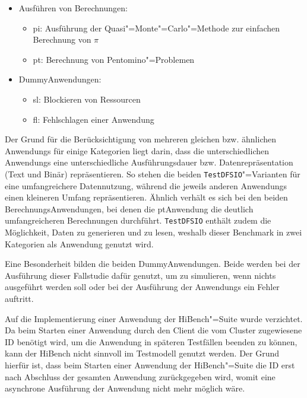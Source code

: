 \begin{itemize}
    \item Ausführen von Berechnungen:
    \begin{itemize}
        \item \acrlong{pi}: Ausführung der Quasi"=Monte"=Carlo"=Methode zur einfachen Berechnung von $\pi$
        \item \gls{pt}: Berechnung von Pentomino"=Problemen
    \end{itemize}

    \item Dummy\gls{Anwendung}en:
    \begin{itemize}
        \item  \gls{sl}: Blockieren von Ressourcen
        \item  \gls{fl}: Fehlschlagen einer Anwendung
    \end{itemize}
\end{itemize}

Der Grund für die Berücksichtigung von mehreren gleichen bzw. ähnlichen \glspl{Anwendung} für einige Kategorien liegt darin, dass die unterschiedlichen \glspl{Anwendung} eine unterschiedliche Ausführungsdauer bzw. Datenrepräsentation (Text und Binär) repräsentieren.
So stehen die beiden \texttt{TestDFSIO}"=Varianten für eine umfangreichere Datennutzung, während die jeweils anderen \glspl{Anwendung} einen kleineren Umfang repräsentieren.
Ähnlich verhält es sich bei den beiden Berechnungs\gls{Anwendung}en, bei denen die \acrlong{pt}\gls{Anwendung} die deutlich umfangreicheren Berechnungen durchführt.
\texttt{TestDFSIO} enthält zudem die Möglichkeit, Daten zu generieren und zu lesen, weshalb dieser Benchmark in zwei Kategorien als \gls{Anwendung} genutzt wird.

Eine Besonderheit bilden die beiden Dummy\gls{Anwendung}en.
Beide werden bei der Ausführung dieser Fallstudie dafür genutzt, um zu simulieren, wenn nichts ausgeführt werden soll oder bei der Ausführung der \glspl{Anwendung} ein Fehler auftritt.

Auf die Implementierung einer \gls{Anwendung} der HiBench"=Suite wurde verzichtet.
Da beim Starten einer \gls{Anwendung} durch den Client die vom Cluster zugewiesene ID benötigt wird, um die \gls{Anwendung} in späteren Testfällen beenden zu können, kann der HiBench nicht sinnvoll im Testmodell genutzt werden.
Der Grund hierfür ist, dass beim Starten einer \gls{Anwendung} der HiBench"=Suite die ID erst nach Abschluss der gesamten \gls{Anwendung} zurückgegeben wird, womit eine asynchrone Ausführung der \gls{Anwendung} nicht mehr möglich wäre.

